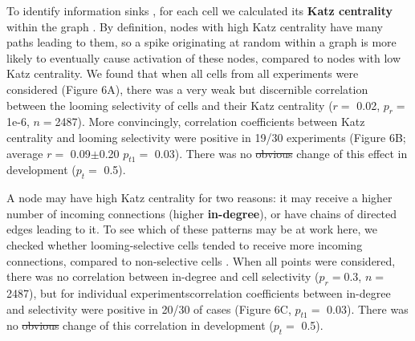 \documentclass{article}
\providecommand{\DIFaddtex}[1]{{\protect\color{blue}{#1}}} %
\providecommand{\DIFdeltex}[1]{{\protect\color{red}\sout{#1}}}                      %
\providecommand{\DIFaddbegin}{} %
\providecommand{\DIFaddend}{} %
\providecommand{\DIFdelbegin}{} %
\providecommand{\DIFdelend}{} %
\providecommand{\DIFadd}[1]{\texorpdfstring{\DIFaddtex{#1}}{#1}} %
\providecommand{\DIFdel}[1]{\texorpdfstring{\DIFdeltex{#1}}{}} %
\newcommand{\DIFscaledelfig}{0.5}
\newlength{\DIFdelgraphicswidth} %
\newlength{\DIFdelgraphicsheight} %
\newcommand{\DIFaddincludegraphics}[2][]{{\color{blue}\fbox{\DIFOincludegraphics[#1]{#2}}}} %
\newcommand{\DIFdelincludegraphics}[2][]{%
\sbox{\DIFdelgraphicsbox}{\DIFOincludegraphics[#1]{#2}}%
\settoboxwidth{\DIFdelgraphicswidth}{\DIFdelgraphicsbox} %
\settoboxtotalheight{\DIFdelgraphicsheight}{\DIFdelgraphicsbox} %
\scalebox{\DIFscaledelfig}{%
\parbox[b]{\DIFdelgraphicswidth}{\usebox{\DIFdelgraphicsbox}\\[-\baselineskip] \rule{\DIFdelgraphicswidth}{0em}}\llap{\resizebox{\DIFdelgraphicswidth}{\DIFdelgraphicsheight}{%
\setlength{\unitlength}{\DIFdelgraphicswidth}%
\begin{picture}(1,1)%
\thicklines\linethickness{2pt} %
{\color[rgb]{1,0,0}\put(0,0){\framebox(1,1){}}}%
{\color[rgb]{1,0,0}\put(0,0){\line( 1,1){1}}}%
{\color[rgb]{1,0,0}\put(0,1){\line(1,-1){1}}}%
\end{picture}%
}\hspace*{3pt}}} %
} %
\DeclareRobustCommand{\DIFaddbegin}{\DIFOaddbegin \let\includegraphics\DIFaddincludegraphics} %
\DeclareRobustCommand{\DIFaddend}{\DIFOaddend \let\includegraphics\DIFOincludegraphics} %
\DeclareRobustCommand{\DIFdelbegin}{\DIFOdelbegin \let\includegraphics\DIFdelincludegraphics} %
\DeclareRobustCommand{\DIFdelend}{\DIFOaddend \let\includegraphics\DIFOincludegraphics} %
\begin{document}
To identify information sinks \DIFaddbegin \DIFadd{(neurons that tended to collect activation from the rest of the network)}\DIFaddend , for each cell we calculated its \textbf{Katz centrality} within the graph \citep{katz1953original, fletcher2018katz}. By definition, nodes with high Katz centrality have many paths leading to them, so a spike originating at random within a graph is more likely to eventually cause activation of these nodes, compared to nodes with low Katz centrality. We found that when all cells from all experiments were considered (Figure 6A), there was a very weak but \DIFaddbegin \DIFadd{statistically }\DIFaddend discernible correlation between the looming selectivity of cells and their Katz centrality ($r =$ 0.02, $p_{r} =$ 1e-6, $n=$2487). More convincingly, correlation coefficients between Katz centrality and looming selectivity were \DIFaddbegin \DIFadd{weak but }\DIFaddend positive in 19/30 experiments (Figure 6B; average $r=$ 0.09$\pm$0.20 $p_{t1}=$ 0.03). There was no \DIFdelbegin \DIFdel{obvious }\DIFdelend change of this effect in development ($p_t=$ 0.5).

A node may have high Katz centrality for two reasons: it may receive a higher number of incoming connections (higher \textbf{in-degree}), or have chains of directed edges leading to it. To see which of these patterns may be at work here, we checked whether looming-selective cells tended to receive more incoming connections, compared to non-selective cells \citep{litwin2014assemblies}. When all points were considered, there was no correlation between in-degree and cell selectivity ($p_{r}=$0.3, $n=$ 2487), but for individual experiments\DIFaddbegin \DIFadd{, }\DIFaddend correlation coefficients between in-degree and selectivity were positive in 20/30 of cases (Figure 6C, $p_{t1}=$ 0.03)\DIFaddbegin \DIFadd{, which suggests that selective cells may tend to receive more incoming connections than non-selective cells}\DIFaddend . There was no \DIFdelbegin \DIFdel{obvious }\DIFdelend change of this correlation in development ($p_t=$ 0.5).
\end{document}
